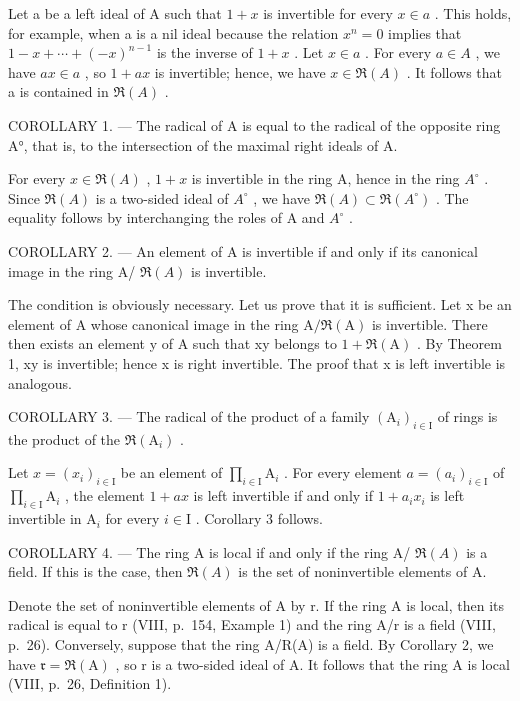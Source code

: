Let a be a left ideal of A such that \(1 + x\) is invertible for every \(x \in a\) . This holds, for example, when a is a nil ideal because the relation \(x^{n} = 0\) implies that \(1 - x + \cdots + (-x)^{n-1}\) is the inverse of \(1 + x\) . Let \(x \in a\) . For every \(a \in A\) , we have \(ax \in a\) , so \(1 + ax\) is invertible; hence, we have \(x \in \Re(A)\) . It follows that a is contained in \(\Re(A)\) .

COROLLARY 1. --- The radical of A is equal to the radical of the opposite ring A°, that is, to the intersection of the maximal right ideals of A.

For every \(x \in \Re(A)\) , \(1 + x\) is invertible in the ring A, hence in the ring \(A^{\circ}\) . Since \(\Re(A)\) is a two-sided ideal of \(A^{\circ}\) , we have \(\Re(A) \subset \Re(A^{\circ})\) . The equality follows by interchanging the roles of A and \(A^{\circ}\) .

COROLLARY 2. --- An element of A is invertible if and only if its canonical image in the ring A/ \(\Re(A)\) is invertible.

The condition is obviously necessary. Let us prove that it is sufficient. Let x be an element of A whose canonical image in the ring \(\mathrm{A}/\Re(\mathrm{A})\) is invertible. There then exists an element y of A such that xy belongs to \(1 + \Re(\mathrm{A})\) . By Theorem 1, xy is invertible; hence x is right invertible. The proof that x is left invertible is analogous.

COROLLARY 3. --- The radical of the product of a family \((\mathrm{A}_{i})_{i\in\mathrm{I}}\) of rings is the product of the \(\mathfrak{R}(\mathrm{A}_{i})\) .

Let \(x = (x_{i})_{i\in \mathrm{I}}\) be an element of \(\prod_{i\in \mathrm{I}}\mathrm{A}_{i}\) . For every element \(a = (a_{i})_{i\in \mathrm{I}}\) of \(\prod_{i\in \mathrm{I}}\mathrm{A}_{i}\) , the element \(1 + ax\) is left invertible if and only if \(1 + a_{i}x_{i}\) is left invertible in \(\mathrm{A}_i\) for every \(i\in \mathrm{I}\) . Corollary 3 follows.

COROLLARY 4. --- The ring A is local if and only if the ring A/ \(\Re(A)\) is a field. If this is the case, then \(\Re(A)\) is the set of noninvertible elements of A.

Denote the set of noninvertible elements of A by r. If the ring A is local, then its radical is equal to r (VIII, p.~154, Example 1) and the ring A/r is a field (VIII, p.~26). Conversely, suppose that the ring A/R(A) is a field. By Corollary 2, we have \(\mathfrak{r} = \Re(\mathrm{A})\) , so r is a two-sided ideal of A. It follows that the ring A is local (VIII, p.~26, Definition 1).


